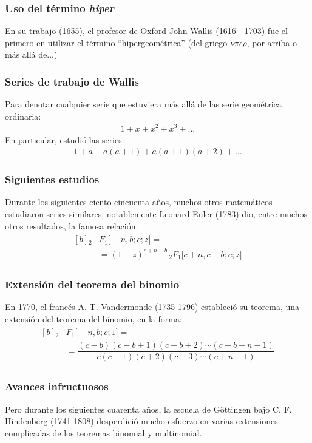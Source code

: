 \documentclass[12pt]{beamer}
\begin{document}
\begin{frame}
\frametitle{Uso del término \emph{hiper}}
En su trabajo  (1655), el profesor de Oxford John Wallis (1616 - 1703) fue el primero en utilizar el término \enquote{hipergeométrica} (del griego $\acute{\nu} \pi \epsilon \rho$, por arriba o más allá de...)
\end{frame}
\begin{frame}
\frametitle{Series de trabajo de Wallis}
Para denotar cualquier serie que estuviera más allá de las serie geométrica ordinaria:
\pause
\begin{align*}
1 + x + x^{2} + x^{3} + \ldots
\end{align*}
\pause
En particular, estudió las series:
\begin{align*}
1 + a + a( a + 1) + a (a + 1)(a + 2) + \ldots
\end{align*}
\end{frame}
\begin{frame}
\frametitle{Siguientes estudios}
Durante los siguientes ciento cincuenta años, muchos otros matemáticos estudiaron series similares, notablemente Leonard Euler (1783) dio, entre muchos otros resultados, la famosa relación:
\pause
\begin{align}
\begin{aligned}[b]
{}_{2} &F_{1} \big[ -n, b; c; z \big] = \\[0.5em]
&= (1 - z)^{c+n-b} \, {}_{2} F_{1} \big[ c + n, c - b; c; z \big]
\end{aligned}
\label{eq:ecuacion_01_01_03} 
\end{align}
\end{frame}
\begin{frame}
\frametitle{Extensión del teorema del binomio}
En 1770, el francés A. T. Vandermonde (1735-1796) estableció su teorema, una extensión del teorema del binomio, en la forma:
\pause
\begin{align}
\begin{aligned}[b]
{}_{2} &F_{1} \big[ -n, b; c; 1 \big] = \\[0.5em]
&= \dfrac{(c {-} b)(c {-} b {+} 1)(c {-} b {+} 2) \cdots (c {-} b {+} n {-} 1)}{c (c {+} 1)(c {+} 2)(c {+} 3) \cdots (c {+} n {-} 1)}
\end{aligned}
\label{eq:ecuacion_01_01_04}
\end{align}
\end{frame}
\begin{frame}
\frametitle{Avances infructuosos}
Pero durante los siguientes cuarenta años, la escuela de Göttingen bajo C. F. Hindenberg (1741-1808) desperdició mucho esfuerzo en varias extensiones complicadas de los teoremas binomial y multinomial.
\end{frame}
\end{document}
